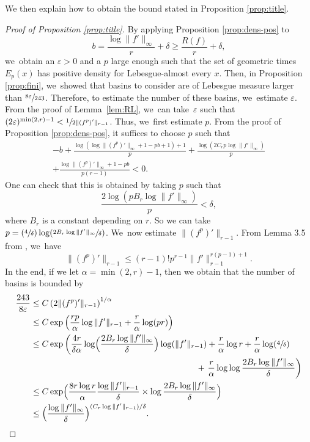 \documentclass[JEP,XML,SOM,Unicode,NoFloatCountersInSection,published]{cedram}
\newcommand{\Psfrac}[2]{(\sfrac{#1}{#2})}
\theoremstyle{definition}
\begin{document}
We then explain how to obtain the bound stated in Proposition \ref{prop:title}.\enlargethispage{-2\baselineskip}

\begin{proof}[Proof of Proposition \ref{prop:title}]
By applying Proposition \ref{prop:dens-pos} to
\[
b = \frac{\log \| f' \|_{\infty}}{r} + \delta \geq \frac{R(f)}{r} + \delta,
\]
we~obtain an $\varepsilon > 0$ and a $p$ large enough such that the set of geometric times $E_p(x)$ has positive density for Lebesgue-almost every $x$.
Then, in Proposition \ref{prop:fini}, we~showed that basins to consider are of Lebesgue measure larger than $\sfrac{8 \varepsilon}{243}$.
Therefore, to estimate the number of these basins, we~estimate $\varepsilon$.
From the proof of Lemma~\ref{lem:RL}, we~can take~$\varepsilon$ such that $(2 \varepsilon)^{\min(2,r) - 1} < \sfrac{1}{2 \| (f^p)' \|_{r-1}}$.
Thus, we~first estimate $p$.
From the proof of Proposition \ref{prop:dens-pos}, it suffices to choose $p$ such that
\begin{multline*}
-b + \frac{\log(\log \| (f^p)' \|_{\infty} + 1 - pb+1)+1}{p} + \frac{\log(2 C_r p \log \| f' \|_{\infty})}{p}\\
+ \frac{\log \| (f^p)' \|_{\infty} + 1 - pb}{p(r-1)} < 0.
\end{multline*}
One can check that this is obtained by taking $p$ such that
\[
\frac{2\log(p B_r \log \| f' \|_{\infty})}{p} < \delta,
\]
where $B_r$ is a constant depending on $r$.
So we can take $p = \Psfrac{4}{\delta} \log \Psfrac{2 B_r \log \| f' \|_{\infty}}{\delta}$. We~now estimate $\| (f^p)' \|_{r-1}$.
From Lemma 3.5 from \cite{MR3384516}, we~have
\[
\| (f^p)' \|_{r-1} \leq (r-1)! p^{r-1} \| f' \|_{r-1}^{r(p-1) +1 }.
\]
In the end, if we let $\alpha = \min(2,r)-1$, then we obtain that the number of basins is bounded by
\begin{align*}
\frac{243}{8 \varepsilon} &\leq C \left (2 \| (f^p)' \|_{r-1} \right)^{1/\alpha}\\
&\leq C \exp \left (\frac{rp}{\alpha} \log \| f' \|_{r-1} + \frac{r}{\alpha} \log (pr) \right)\\
&\leq C \exp \left (\frac{4r}{\delta \alpha} \log \Bigl (\frac{2 B_r \log \| f' \|_{\infty}}{\delta} \Bigr) \log (\| f' \|_{r-1}) + \frac{r}{\alpha} \log r + \frac{r}{\alpha} \log \Psfrac {4}{\delta} \right.\\
&\hspace{6.8cm}+ \left. \frac{r}{\alpha} \log \log \frac{2 B_r \log \| f' \|_{\infty}}{\delta} \right)\\
&\leq C \exp \Bigl (\frac{8 r \log r}{\alpha} \frac{\log \| f' \|_{r-1}}{\delta} \times \log \frac{2 B_r \log \| f' \|_{\infty}}{\delta} \Bigr)\\
&\leq \Bigl (\frac{\log \| f' \|_{\infty}}{\delta} \Bigr)^{ (C_r \log \| f' \|_{r-1}) / \delta }.\qedhere
\end{align*}
\end{proof}
\end{document}
